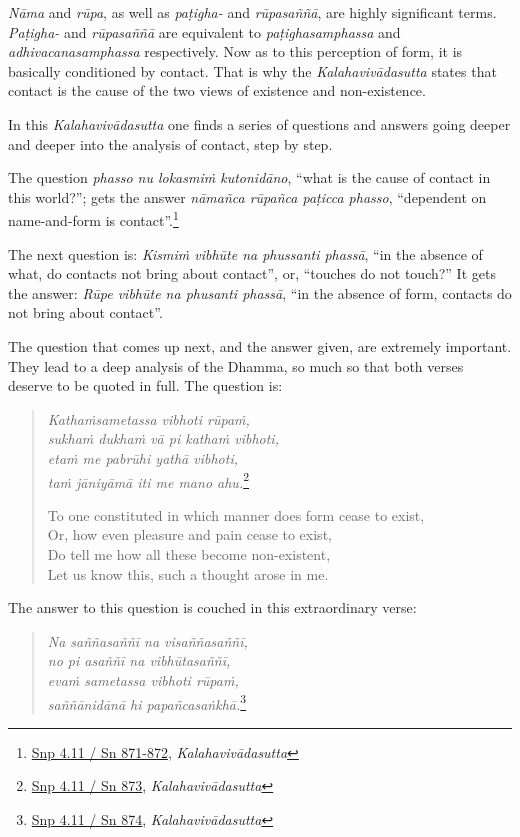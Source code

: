 \emph{Nāma} and \emph{rūpa}, as well as \emph{paṭigha-} and \emph{rūpasaññā}, are highly significant terms. \emph{Paṭigha-} and \emph{rūpasaññā} are equivalent to \emph{paṭighasamphassa} and \emph{adhivacanasamphassa} respectively. Now as to this perception of form, it is basically conditioned by contact. That is why the \emph{Kalahavivādasutta} states that contact is the cause of the two views of existence and non-existence.

In this \emph{Kalahavivādasutta} one finds a series of questions and answers going deeper and deeper into the analysis of contact, step by step.

The question \emph{phasso nu lokasmiṁ kutonidāno}, ``what is the cause of contact in this world?''; gets the answer \emph{nāmañca rūpañca paṭicca phasso}, ``dependent on name-and-form is contact''.\footnote{\href{https://suttacentral.net/snp4.11/pli/ms}{Snp 4.11 / Sn 871-872}, \emph{Kalahavivādasutta}}

The next question is: \emph{Kismiṁ vibhūte na phussanti phassā}, ``in the absence of what, do contacts not bring about contact'', or, ``touches do not touch?'' It gets the answer: \emph{Rūpe vibhūte na phusanti phassā}, ``in the absence of form, contacts do not bring about contact''.

The question that comes up next, and the answer given, are extremely important. They lead to a deep analysis of the Dhamma, so much so that both verses deserve to be quoted in full. The question is:

\begin{quote}
\emph{Kathaṁsametassa vibhoti rūpaṁ,}\\
\emph{sukhaṁ dukhaṁ vā pi kathaṁ vibhoti,}\\
\emph{etaṁ me pabrūhi yathā vibhoti,}\\
\emph{taṁ jāniyāmā iti me mano ahu.}\footnote{\href{https://suttacentral.net/snp4.11/pli/ms}{Snp 4.11 / Sn 873}, \emph{Kalahavivādasutta}}

To one constituted in which manner does form cease to exist,\\
Or, how even pleasure and pain cease to exist,\\
Do tell me how all these become non-existent,\\
Let us know this, such a thought arose in me.
\end{quote}

The answer to this question is couched in this extraordinary verse:

\begin{quote}
\emph{Na saññasaññī na visaññasaññī,}\\
\emph{no pi asaññī na vibhūtasaññī,}\\
\emph{evaṁ sametassa vibhoti rūpaṁ,}\\
\emph{saññānidānā hi papañcasaṅkhā.}\footnote{\href{https://suttacentral.net/snp4.11/pli/ms}{Snp 4.11 / Sn 874}, \emph{Kalahavivādasutta}}
\end{quote}

